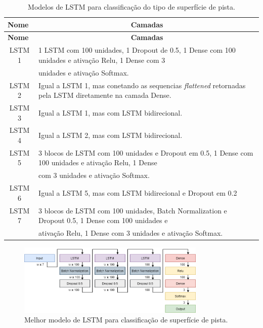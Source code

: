 \begin{center}
\scriptsize
\begin{longtable}{cl}
\caption{Modelos de LSTM para classificação do tipo de superfície de pista.}
\label{table:lstm_superficie_pista_1} \\
\toprule 
\multicolumn{1}{l}{\textbf{Nome}} & 
\multicolumn{1}{c}{\textbf{Camadas}} \\ \midrule
\endfirsthead
\toprule 
\multicolumn{1}{l}{\textbf{Nome}} & 
\multicolumn{1}{c}{\textbf{Camadas}} \\ \midrule
\endhead \endfoot \endlastfoot
LSTM 1 & 1 LSTM com 100 unidades, 1 Dropout de 0.5, 1 Dense com 100 unidades e ativação Relu,  1 Dense com 3 \\ & unidades e  ativação Softmax. \\ \midrule
LSTM 2 & Igual a LSTM 1, mas conetando as sequencias \textit{flattened} retornadas pela LSTM diretamente na camada Dense. \\ \midrule
LSTM 3 & Igual a LSTM 1, mas com LSTM bidirecional. \\ \midrule
LSTM 4 & Igual a LSTM 2, mas com LSTM bidirecional. \\ \midrule
LSTM 5 & 3 blocos de LSTM com 100 unidades e Dropout em 0.5, 1 Dense com 100 unidades e ativação Relu, 1 Dense \\ & com 3  unidades e ativação Softmax.\\ \midrule
LSTM 6 & Igual a LSTM 5, mas com LSTM bidirecional e Dropout em 0.2 \\ \midrule
LSTM 7 & 3 blocos de LSTM com 100 unidades, Batch Normalization e Dropout 0.5, 1 Dense com 100 unidades e \\ & ativação Relu, 1 Dense com 3 unidades e ativação Softmax. \\ \bottomrule
\end{longtable}
\end{center}

\begin{figure}[h]
  \centering
  \caption{Melhor modelo de LSTM para classificação de superfície de pista.}
  \label{fig:best_lstm_tipo_superficie_1}
  \includegraphics[width=0.8\textwidth]{figuras/fig_31.png}
\end{figure}

